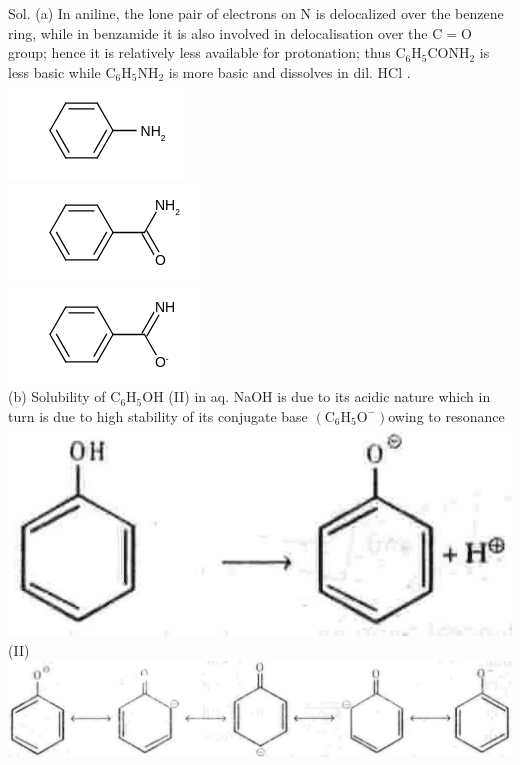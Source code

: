 \documentclass[10pt]{article}
\begin{document}
Sol. (a) In aniline, the lone pair of electrons on N is delocalized over the benzene ring, while in benzamide it is also involved in delocalisation over the $\mathrm{C}=\mathrm{O}$ group; hence it is relatively less available for protonation; thus $\mathrm{C}_{6} \mathrm{H}_{5} \mathrm{CONH}_{2}$ is less basic while $\mathrm{C}_{6} \mathrm{H}_{5} \mathrm{NH}_{2}$ is more basic and dissolves in dil. HCl .\\
\includegraphics{smile-4b83b8caa71d18e9ec117807ed91813c84447029}\\
\includegraphics{smile-02a1805313277ad285f232faa371f8d4876bc8e5}\\
\includegraphics{smile-e613c8f035e5144abac7499cfb2433961123463b}\\
(b) Solubility of $\mathrm{C}_{6} \mathrm{H}_{5} \mathrm{OH}$ (II) in aq. NaOH is due to its acidic nature which in turn is due to high stability of its conjugate base $\left(\mathrm{C}_{6} \mathrm{H}_{5} \mathrm{O}^{-}\right)$owing to resonance\\
\includegraphics[max width=\textwidth, center]{2025_01_28_8470952b98110cec3aabg-117(2)}\\
(II)\\
\includegraphics[max width=\textwidth, center]{2025_01_28_8470952b98110cec3aabg-118}
\end{document}
